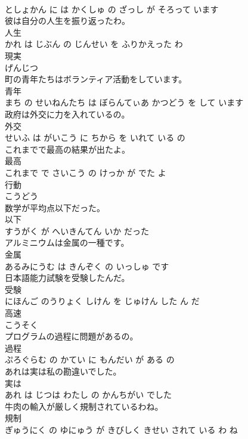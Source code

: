 \documentclass[8pt]{extreport}
\begin{document}
\begin{CJK}{UTF8}{min}
\\	としょかん に は かくしゅ の ざっし が そろって います			
\\	彼は自分の人生を振り返ったわ。	
\\	人生 
\\	かれ は じぶん の じんせい を ふりかえった わ			
\\	現実	
\\	げんじつ			
\\	町の青年たちはボランティア活動をしています。	
\\	青年 
\\	まち の せいねんたち は ぼらんてぃあ かつどう を して います			
\\	政府は外交に力を入れているの。	
\\	外交 
\\	せいふ は がいこう に ちから を いれて いる の			
\\	これまでで最高の結果が出たよ。	
\\	最高 
\\	これまで で さいこう の けっか が でた よ			
\\	行動	
\\	こうどう			
\\	数学が平均点以下だった。	
\\	以下 
\\	すうがく が へいきんてん いか だった			
\\	アルミニウムは金属の一種です。	
\\	金属 
\\	あるみにうむ は きんぞく の いっしゅ です			
\\	日本語能力試験を受験したんだ。	
\\	受験 
\\	にほんご のうりょく しけん を じゅけん した ん だ			
\\	高速	
\\	こうそく			
\\	プログラムの過程に問題があるの。	
\\	過程 
\\	ぷろぐらむ の かてい に もんだい が ある の			
\\	あれは実は私の勘違いでした。	
\\	実は 
\\	あれ は じつは わたし の かんちがい でした			
\\	牛肉の輸入が厳しく規制されているわね。	
\\	規制 
\\	ぎゅうにく の ゆにゅう が きびしく きせい されて いる わ ね			

\end{CJK}
\end{document}
